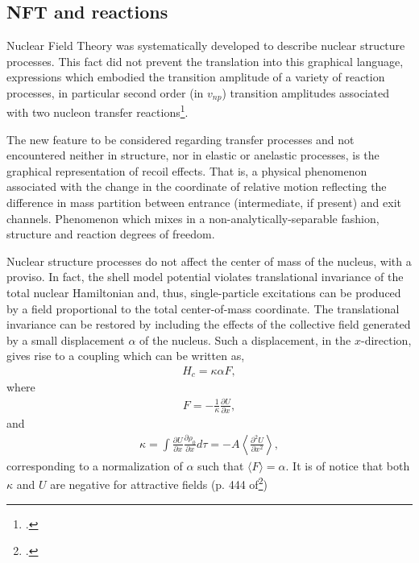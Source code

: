 \begin{subappendices}
\section{NFT and reactions}\label{App1.D}
Nuclear Field Theory was systematically developed to describe nuclear structure processes. This fact did not prevent the translation into this graphical language,  expressions which embodied the transition amplitude of a variety of reaction processes, in particular second order (in $v_{np}$) transition amplitudes associated with two nucleon transfer reactions\footnote{\cite{Broglia:75,Broglia:04a}.}.


The new feature to be considered regarding transfer processes and not encountered neither in structure, nor in elastic or anelastic processes, is the graphical representation of recoil effects. That is, a physical phenomenon associated with the change in the coordinate of relative motion reflecting the difference in mass partition between entrance (intermediate, if present) and exit channels. Phenomenon which mixes in a non-analytically-separable fashion, structure and reaction degrees of freedom.

Nuclear structure processes do not affect the center of mass of the nucleus, with a proviso. In fact, the shell model potential violates translational invariance of the total nuclear Hamiltonian and, thus, single-particle excitations can be produced by a field proportional to the total center-of-mass coordinate. The translational invariance can be restored by including  the effects of the collective field generated by a small displacement $\alpha$ of the nucleus. Such a displacement, in the $x$-direction, gives rise to a coupling which can be written as,
\begin{align}\label{eq1.D.1}
H_{c}=\kappa\alpha F,
\end{align}
where 
\begin{align}\label{eq1.D.2}
F=-\frac{1}{\kappa}\frac{\partial U}{\partial x},
\end{align}
and
\begin{align}\label{eq1.D.3}
\kappa=\int\frac{\partial U}{\partial x}\frac{\partial \rho_0}{\partial x}d\tau=-A\left\langle\frac{\partial^2U}{\partial x^2}\right\rangle,
\end{align}
corresponding to a normalization of $\alpha$ such that $\langle F\rangle=\alpha$. It is of notice that both $\kappa$ and $U$ are negative for attractive fields (p. 444 of\footnote{\cite{Bohr:75}.})



\end{subappendices}
